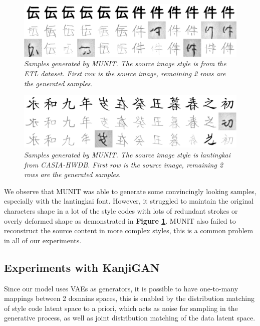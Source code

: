 \documentclass[12pt]{report}
\begin{document}
\begin{figure}[H]
	\centering
	\includegraphics[scale=0.2]{munit-results}
	\caption{\textit{Samples generated by MUNIT\cite{munit}. The source image style is from the ETL dataset. First row is the source image, remaining 2 rows are the generated samples.}}
	\label{fig:munit-results}
\end{figure}

\begin{figure}[H]
	\centering
	\includegraphics[scale=0.2]{munit-results-2}
	\caption{\textit{Samples generated by MUNIT\cite{munit}. The source image style is lantingkai from CASIA-HWDB\cite{casia}. First row is the source image, remaining 2 rows are the generated samples. }}
	\label{fig:munit-results-2}
\end{figure}

We observe that MUNIT was able to generate some convincingly looking samples, especially with the lantingkai font. However, it struggled to maintain the original characters shape in a lot of the style codes with lots of redundant strokes or overly deformed shape as demonstrated in \textbf{Figure \ref{fig:munit-results}}. MUNIT also failed to reconstruct the source content in more complex styles, this is a common problem in all of our experiments.

\subsection{Experiments with KanjiGAN}

Since our model uses VAEs as generators, it is possible to have one-to-many mappings between 2 domains spaces, this is enabled by the distribution matching of style code latent space to a priori, which acts as noise for sampling in the generative process, as well as joint distribution matching of the data latent space.
\end{document}
